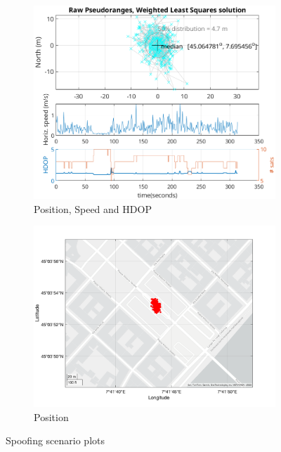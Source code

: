 \begin{figure}[h!]
\begin{subfigure}{0.22\textwidth}
                \includegraphics[width=\textwidth]{images/tests/Monte_Cappuccini/Spoofing/task5_figures/Samsung_A51_Monte_Cappuccini_fig4.png}
                \caption{Position, Speed and HDOP}
                \label{fig:Spoofed_c}
            \end{subfigure}
            \hfill
            \begin{subfigure}{0.23\textwidth}
                \vspace{0.40cm}
                \includegraphics[width=\textwidth]{images/tests/Monte_Cappuccini/Spoofing/task5_figures/Samsung_A51_Monte_Cappuccini_fig6.png}
                \caption{Position}
                \label{fig:Spoofed_d}
            \end{subfigure}
            \vspace{0.35cm}
            \caption{Spoofing scenario plots}
            \label{fig:spoofed_plots}
        \end{figure}

